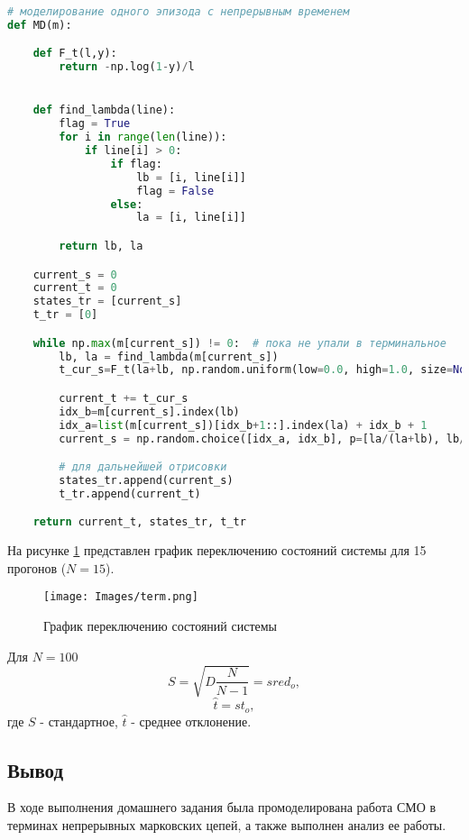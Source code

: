 \begin{lstlisting}[language=python, label=prog,caption={\textit{реализация марковского процесса}}]
# моделирование одного эпизода с непрерывным временем
def MD(m):

    def F_t(l,y):
        return -np.log(1-y)/l


    def find_lambda(line):
        flag = True
        for i in range(len(line)):
            if line[i] > 0:
                if flag:
                    lb = [i, line[i]]
                    flag = False
                else:
                    la = [i, line[i]]

        return lb, la

    current_s = 0
    current_t = 0
    states_tr = [current_s]
    t_tr = [0]

    while np.max(m[current_s]) != 0:  # пока не упали в терминальное
        lb, la = find_lambda(m[current_s])
        t_cur_s=F_t(la+lb, np.random.uniform(low=0.0, high=1.0, size=None))  # -log(1-y)/(lambda_a+lambda_b)

        current_t += t_cur_s
        idx_b=m[current_s].index(lb)
        idx_a=list(m[current_s])[idx_b+1::].index(la) + idx_b + 1
        current_s = np.random.choice([idx_a, idx_b], p=[la/(la+lb), lb/(la+lb)])

        # для дальнейшей отрисовки
        states_tr.append(current_s)
        t_tr.append(current_t)

    return current_t, states_tr, t_tr
\end{lstlisting}

На рисунке \ref{MDP} представлен график переключению состояний системы для 15 прогонов ($N=15$).
\begin{figure}[H]
\centerline{\texttt{[image: Images/term.png]}}
\caption{График переключению состояний системы}
\label{MDP}
\end{figure}

Для $N=100$
$$S=\sqrt{D\frac{N}{N-1}}= {{ sred_o }},$$
$$\hat{t}={{ st_o }},$$
где $S$ - стандартное, $\hat{t}$ - среднее отклонение.

\subsection{Вывод}
В ходе выполнения домашнего задания была промоделирована работа СМО в терминах непрерывных марковских цепей,
а также выполнен анализ ее работы.


